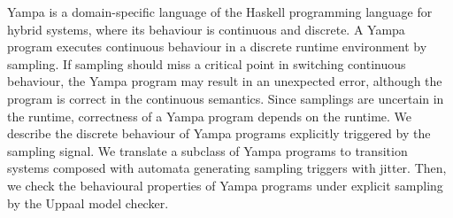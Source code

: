 Yampa is a domain-specific language of the Haskell programming
language for hybrid systems, where its behaviour is continuous and
discrete.  A Yampa program executes continuous behaviour in a discrete
runtime environment by sampling.  If sampling should miss a critical
point in switching continuous behaviour, the Yampa program may result
in an unexpected error, although the program is correct in the
continuous semantics.  Since samplings are uncertain in the runtime,
correctness of a Yampa program depends on the runtime.  We describe
the discrete behaviour of Yampa programs explicitly triggered by the
sampling signal.  We translate a subclass of Yampa programs to
transition systems composed with automata generating sampling triggers
with jitter. Then, we check the behavioural properties of Yampa
programs under explicit sampling by the Uppaal model checker.
